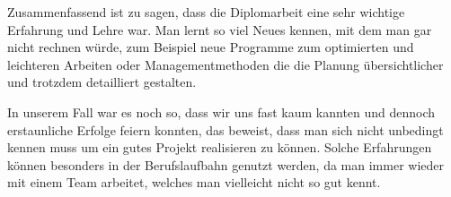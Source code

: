 	Zusammenfassend ist zu sagen, dass die Diplomarbeit eine sehr wichtige Erfahrung und Lehre war.
	Man lernt so viel Neues kennen, mit dem man gar nicht rechnen würde, zum Beispiel neue Programme zum optimierten und leichteren Arbeiten oder Managementmethoden die die Planung übersichtlicher und trotzdem detailliert gestalten.

 	In unserem Fall war es noch so, dass wir uns fast kaum kannten und dennoch erstaunliche Erfolge feiern konnten,
	das beweist, dass man sich nicht unbedingt kennen muss um ein gutes Projekt realisieren zu können. Solche Erfahrungen können besonders in der Berufslaufbahn genutzt werden,
	da man immer wieder mit einem Team arbeitet, welches man vielleicht nicht so gut kennt.
